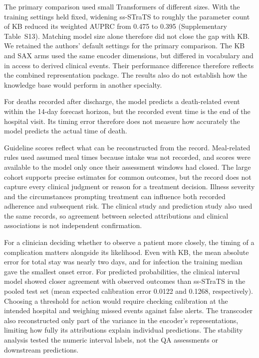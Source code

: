 The primary comparison used small Transformers of different sizes. With the training settings held fixed, widening ss-STraTS to roughly the parameter count of KB reduced its weighted AUPRC from 0.475 to 0.395 (Supplementary Table~S13). Matching model size alone therefore did not close the gap with KB. We retained the authors' default settings for the primary comparison. The KB and SAX arms used the same encoder dimensions, but differed in vocabulary and in access to derived clinical events. Their performance difference therefore reflects the combined representation package. The results also do not establish how the knowledge base would perform in another specialty.

For deaths recorded after discharge, the model predicts a death-related event within the 14-day forecast horizon, but the recorded event time is the end of the hospital visit. Its timing error therefore does not measure how accurately the model predicts the actual time of death.

Guideline scores reflect what can be reconstructed from the record. Meal-related rules used assumed meal times because intake was not recorded, and scores were available to the model only once their assessment windows had closed. The large cohort supports precise estimates for common outcomes, but the record does not capture every clinical judgment or reason for a treatment decision. Illness severity and the circumstances prompting treatment can influence both recorded adherence and subsequent risk. The clinical study and prediction study also used the same records, so agreement between selected attributions and clinical associations is not independent confirmation.

For a clinician deciding whether to observe a patient more closely, the timing of a complication matters alongside its likelihood. Even with KB, the mean absolute error for total stay was nearly two days, and for infection the training median gave the smallest onset error. For predicted probabilities, the clinical interval model showed closer agreement with observed outcomes than ss-STraTS in the pooled test set (mean expected calibration error 0.0122 and 0.1268, respectively). Choosing a threshold for action would require checking calibration at the intended hospital and weighing missed events against false alerts. The transcoder also reconstructed only part of the variance in the encoder's representations, limiting how fully its attributions explain individual predictions. The stability analysis tested the numeric interval labels, not the QA assessments or downstream predictions.
